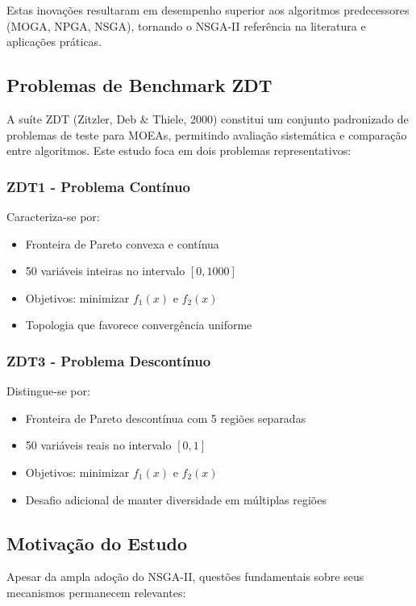 Estas inovações resultaram em desempenho superior aos algoritmos predecessores (MOGA, NPGA, NSGA), tornando o NSGA-II referência na literatura e aplicações práticas.

\subsection{Problemas de Benchmark ZDT}

A suíte ZDT (Zitzler, Deb \& Thiele, 2000) constitui um conjunto padronizado de problemas de teste para MOEAs, permitindo avaliação sistemática e comparação entre algoritmos. Este estudo foca em dois problemas representativos:

\subsubsection{ZDT1 - Problema Contínuo}

Caracteriza-se por:
\begin{itemize}
    \item Fronteira de Pareto convexa e contínua
    \item 50 variáveis inteiras no intervalo $[0, 1000]$
    \item Objetivos: minimizar $f_1(x)$ e $f_2(x)$
    \item Topologia que favorece convergência uniforme
\end{itemize}

\subsubsection{ZDT3 - Problema Descontínuo}

Distingue-se por:
\begin{itemize}
    \item Fronteira de Pareto descontínua com 5 regiões separadas
    \item 50 variáveis reais no intervalo $[0, 1]$
    \item Objetivos: minimizar $f_1(x)$ e $f_2(x)$
    \item Desafio adicional de manter diversidade em múltiplas regiões
\end{itemize}

\subsection{Motivação do Estudo}

Apesar da ampla adoção do NSGA-II, questões fundamentais sobre seus mecanismos permanecem relevantes:

